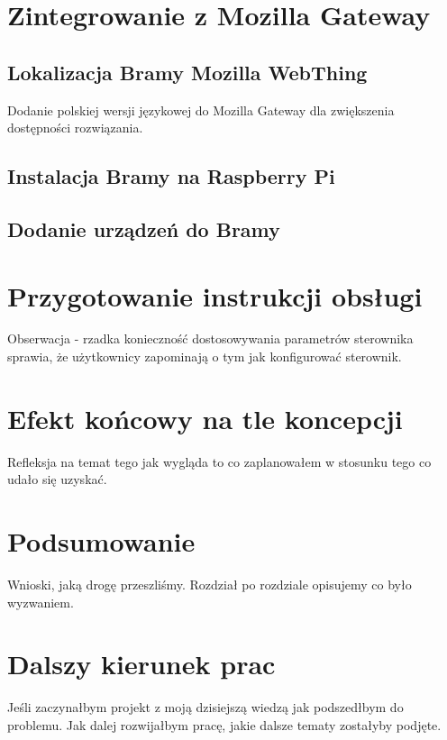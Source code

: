 \documentclass[11pt]{report}
\begin{document}
 
 \chapter{Zintegrowanie z Mozilla Gateway}
 \section{Lokalizacja Bramy Mozilla WebThing}
 Dodanie polskiej wersji językowej do Mozilla Gateway dla zwiększenia dostępności rozwiązania.
 \section{Instalacja Bramy na Raspberry Pi}
 \section{Dodanie urządzeń do Bramy}
 
 \chapter{Przygotowanie instrukcji obsługi}
 Obserwacja - rzadka konieczność dostosowywania parametrów sterownika sprawia, że użytkownicy zapominają o tym jak konfigurować sterownik.
 
 
 \chapter{Efekt końcowy na tle koncepcji}
 Refleksja na temat tego jak wygląda to co zaplanowałem w stosunku tego co udało się uzyskać.
 
 
 \chapter*{Podsumowanie}
 Wnioski, jaką drogę przeszliśmy. Rozdział po rozdziale opisujemy co było wyzwaniem.
 
 
 \chapter*{Dalszy kierunek prac}
 Jeśli zaczynałbym projekt z moją dzisiejszą wiedzą jak podszedłbym do problemu. Jak dalej rozwijałbym pracę, jakie dalsze tematy zostałyby podjęte. 


\end{document}
